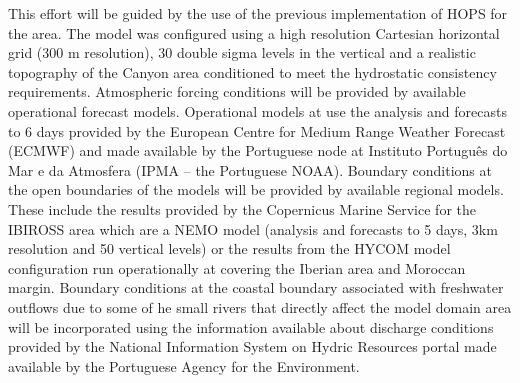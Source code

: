 This effort will be guided by the use of the previous implementation
of HOPS for the \naz area. The model was configured using a high
resolution Cartesian horizontal grid (300 m resolution), 30 double
sigma levels in the vertical and a realistic topography of the \naz
Canyon area conditioned to meet the hydrostatic consistency
requirements.  Atmospheric forcing conditions will be provided by
available operational forecast models. Operational models at \inst use
the analysis and forecasts to 6 days provided by the European Centre
for Medium Range Weather Forecast (ECMWF) and made available by the
Portuguese node at Instituto Portugu\^{e}s do Mar e da Atmosfera (IPMA
-- the Portuguese NOAA).  Boundary conditions at the open boundaries
of the models will be provided by available regional models. These
include the results provided by the Copernicus Marine Service for the
IBIROSS area which are a NEMO model (analysis and forecasts to 5 days,
3km resolution and 50 vertical levels) or the results from the HYCOM
model configuration run operationally at \inst covering the Iberian
area and Moroccan margin.  Boundary conditions at the coastal boundary
associated with freshwater outflows due to some of he small rivers
that directly affect the model domain area will be incorporated using
the information available about discharge conditions provided by the
National Information System on Hydric Resources portal made available
by the Portuguese Agency for the Environment.


